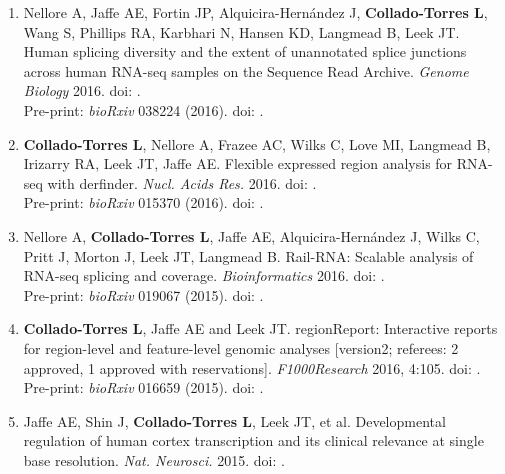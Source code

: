 \begin{enumerate}
        \item Nellore A, Jaffe AE, Fortin JP, Alquicira-Hernández J, \textbf{Collado-Torres L}, Wang S, Phillips RA, Karbhari N, Hansen KD, Langmead B, Leek JT. Human splicing diversity and the extent of unannotated splice junctions across human RNA-seq samples on the Sequence Read Archive. \emph{Genome Biology} 2016. doi: .
        \\ Pre-print: \emph{bioRxiv} 038224 (2016). doi: .
        
        \item \textbf{Collado-Torres L}, Nellore A, Frazee AC, Wilks C, Love MI, Langmead B, Irizarry RA, Leek JT, Jaffe AE. Flexible expressed region analysis for RNA-seq with derfinder. \emph{Nucl. Acids Res.} 2016. doi: .
        \\ Pre-print: \emph{bioRxiv} 015370 (2016). doi: .
        
        \item Nellore A, \textbf{Collado-Torres L}, Jaffe AE, Alquicira-Hernández J, Wilks C, Pritt J, Morton J, Leek JT, Langmead B. Rail-RNA: Scalable analysis of RNA-seq splicing and coverage. \emph{Bioinformatics} 2016. doi: .
        \\ Pre-print: \emph{bioRxiv} 019067 (2015). doi: .
        
        \item \textbf{Collado-Torres L}, Jaffe AE and Leek JT. regionReport: Interactive reports for region-level and feature-level genomic analyses [version2; referees: 2 approved, 1 approved with reservations]. \emph{F1000Research} 2016, 4:105. doi: .
        \\ Pre-print: \emph{bioRxiv} 016659 (2015). doi: .
        
        \item Jaffe AE, Shin J, \textbf{Collado-Torres L}, Leek JT, et al. Developmental regulation of human cortex transcription and its clinical relevance at single base resolution. \emph{Nat. Neurosci.} 2015. doi: .
        

\end{enumerate}
